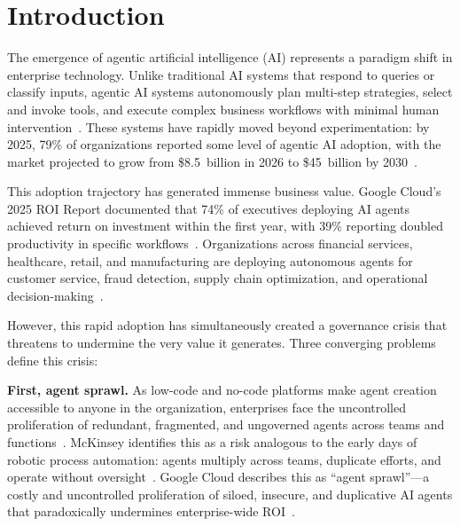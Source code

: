 \documentclass[ai,article,submit,pdftex,moreauthors]{Definitions/mdpi}
\begin{document}
\section{Introduction}\label{sec:introduction}

The emergence of agentic artificial intelligence (AI) represents a paradigm shift in enterprise technology. Unlike traditional AI systems that respond to queries or classify inputs, agentic AI systems autonomously plan multi-step strategies, select and invoke tools, and execute complex business workflows with minimal human intervention~\cite{wang2024survey,acharya2025agentic}. These systems have rapidly moved beyond experimentation: by 2025, 79\% of organizations reported some level of agentic AI adoption, with the market projected to grow from \$8.5~billion in 2026 to \$45~billion by 2030~\cite{deloitte2026state,wef2026agentic}.

This adoption trajectory has generated immense business value. Google Cloud's 2025 ROI Report documented that 74\% of executives deploying AI agents achieved return on investment within the first year, with 39\% reporting doubled productivity in specific workflows~\cite{googlecloud2025roi}. Organizations across financial services, healthcare, retail, and manufacturing are deploying autonomous agents for customer service, fraud detection, supply chain optimization, and operational decision-making~\cite{deloitte2025emerging,kpmg2026q4pulse}.

However, this rapid adoption has simultaneously created a governance crisis that threatens to undermine the very value it generates. Three converging problems define this crisis:

\textbf{First, agent sprawl.} As low-code and no-code platforms make agent creation accessible to anyone in the organization, enterprises face the uncontrolled proliferation of redundant, fragmented, and ungoverned agents across teams and functions~\cite{googlecloud2026blueprint}. McKinsey identifies this as a risk analogous to the early days of robotic process automation: agents multiply across teams, duplicate efforts, and operate without oversight~\cite{mckinsey2025seizing}. Google Cloud describes this as ``agent sprawl''---a costly and uncontrolled proliferation of siloed, insecure, and duplicative AI agents that paradoxically undermines enterprise-wide ROI~\cite{googlecloud2026blueprint2}.
\end{document}
